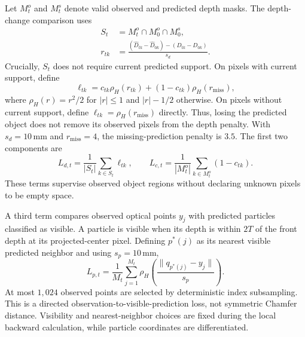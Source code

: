 Let $M_t^o$ and $M_t^s$ denote valid observed and predicted depth masks. The depth-change comparison uses
\begin{equation}
 \begin{aligned}
 S_t&=M_t^o\cap M_0^o\cap M_0^s,\\
 r_{tk}&=\frac{(\hat D_{tk}-\hat D_{0k})-(D_{tk}-D_{0k})}{s_d}.
 \end{aligned}
 \label{eq:depthchange}
\end{equation}
Crucially, $S_t$ does not require current predicted support. On pixels with current support, define
\begin{equation}
 \ell_{tk}=c_{tk}\rho_H(r_{tk})+(1-c_{tk})\rho_H(r_{\mathrm{miss}}),
\end{equation}
where $\rho_H(r)=r^2/2$ for $|r|\leq1$ and $|r|-1/2$ otherwise. On pixels without current support, define $\ell_{tk}=\rho_H(r_{\mathrm{miss}})$ directly. Thus, losing the predicted object does not remove its observed pixels from the depth penalty. With $s_d=10\,\mathrm{mm}$ and $r_{\mathrm{miss}}=4$, the missing-prediction penalty is $3.5$. The first two components are
\begin{equation}
 L_{d,t}=\frac{1}{|S_t|}\sum_{k\in S_t}\ell_{tk},\qquad
 L_{c,t}=\frac{1}{|M_t^o|}\sum_{k\in M_t^o}(1-c_{tk}).
 \label{eq:depthcoverage}
\end{equation}
These terms supervise observed object regions without declaring unknown pixels to be empty space.

A third term compares observed optical points $y_j$ with predicted particles classified as visible. A particle is visible when its depth is within $2T$ of the front depth at its projected-center pixel. Defining $p^*(j)$ as its nearest visible predicted neighbor and using $s_p=10\,\mathrm{mm}$,
\begin{equation}
 L_{p,t}=\frac{1}{M_t}\sum_{j=1}^{M_t}
 \rho_H\!\left(\frac{\|q_{p^*(j)}-y_j\|}{s_p}\right).
 \label{eq:pointloss}
\end{equation}
At most $1{,}024$ observed points are selected by deterministic index subsampling. This is a directed observation-to-visible-prediction loss, not symmetric Chamfer distance. Visibility and nearest-neighbor choices are fixed during the local backward calculation, while particle coordinates are differentiated.

